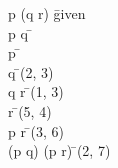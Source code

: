 \documentclass{article}
\begin{document}
\begin{proofbox}
\: p \rightarrow (q \rightarrow r) \= \hbox{given} \\
\open
\: p \rightarrow q \= \asm \\
\open
\: p \= \asm \\
\: q \= \implieselim(2, 3) \\
\: q \rightarrow r \= \implieselim(1, 3) \\
\: r \= \implieselim(5, 4) \\
\close
\: p \rightarrow r \= \impliesintro(3, 6) \\
\close
\: (p \rightarrow q) \rightarrow (p \rightarrow r) \= \impliesintro(2, 7) \\
\end{proofbox}
\end{document}
